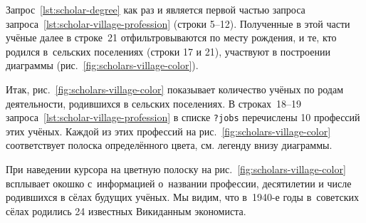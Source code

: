 Запрос~\ref{lst:scholar-degree} как раз и является 
первой частью запроса запроса~\ref{lst:scholar-village-profession} (строки 5--12). 
Полученные в этой части учёные далее в строке~21 
отфильтровываются по месту рождения, и те, кто родился в~сельских поселениях (строки 17 и 21), 
участвуют в построении диаграммы (рис.~\ref{fig:scholars-village-color}).


Итак, рис.~\ref{fig:scholars-village-color} показывает количество учёных по родам деятельности, 
родившихся в сельских поселениях. 
В строках~18--19 запроса~\ref{lst:scholar-village-profession} 
в списке \lstinline|?jobs| перечислены 10 профессий этих учёных. 
%
% 
%
Каждой из этих профессий на рис.~\ref{fig:scholars-village-color} 
соответствует полоска определённого цвета, см. легенду внизу диаграммы. 

При наведении курсора на цветную полоску на рис.~\ref{fig:scholars-village-color} 
всплывает окошко с~информацией о~названии профессии, десятилетии и числе родившихся в сёлах будущих учёных. 
Мы видим, что в~1940-е годы в~советских сёлах родились 24 известных Викиданным экономиста.%

